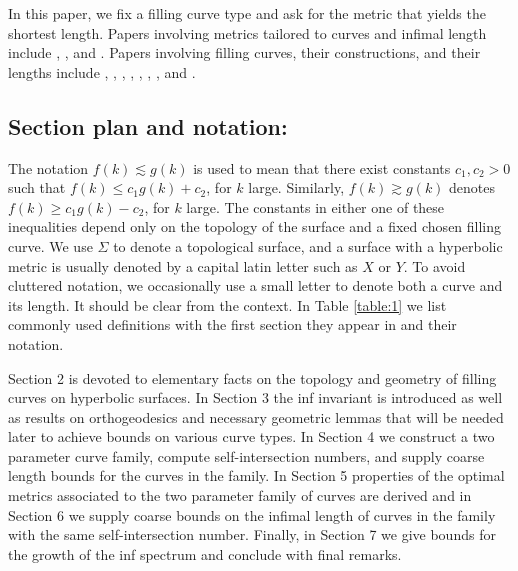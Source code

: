 \documentclass[12pt]{amsart}
\numberwithin{equation}{section}
\theoremstyle{plain}
\begin{document}
In this paper, we fix a filling curve type and ask for the metric that yields the shortest length.  Papers involving metrics tailored to  curves and infimal length include \cite{aougabmetricsuited}, \cite{souto2018counting}, and 
\cite{Gasterinfima}.
Papers involving filling curves, their constructions, and their lengths include
\cite{aougab2022combinatoriallyrandomcurvessurfaces}, 
\cite{arettines2015geometry},
\cite{girondo2023minima}, 
 \cite{parlier2021topological},
 \cite{sapir2023lengthcomparisontheoremgeodesic},
 \cite{Voshortclosed},
\cite{wanglengthminoneholetorus}, 
and \cite{zhang2008hyperbolic}.



\subsection{Section plan and notation:}
\label{subsec: plan}



 The notation $f(k) \lesssim g(k)$ is used to mean that
there exist constants $c_1, c_2 >0$ such that
$f(k) \leq c_{1} g(k) + c_2$, for $k$ large.  Similarly,   $f(k) \gtrsim g(k)$ 
denotes $f(k) \geq  c_{1} g(k) -c_2$, for $k$ large. The constants in either one of these inequalities depend only on the topology of the surface and a fixed chosen filling curve. We use $\Sigma$ to denote a topological surface, and
a surface with a hyperbolic metric is usually denoted by a capital latin letter such as $X$ or $Y$. To avoid cluttered notation, we occasionally use a small letter to denote both a curve and its length. It  should be clear from the context.   In Table \ref{table:1}  we list commonly used definitions with the first section they appear in and their notation. 

Section 2 is devoted to elementary facts  on the topology and geometry of filling curves on hyperbolic surfaces. 
In Section 3 the inf invariant is introduced as well as results on orthogeodesics and necessary geometric lemmas that will be needed later to achieve bounds on various curve types.  In Section 4 we construct a two parameter curve family, compute self-intersection numbers,  and supply  coarse length bounds for the curves in the family. In Section 5 properties of the optimal metrics associated to the two parameter family of curves are derived  and in Section 6 we supply coarse bounds on   the infimal length of  curves in the family with the same self-intersection number. Finally, in Section 7 we give bounds for the growth of the inf spectrum and conclude with final remarks. 
 
\end{document}
